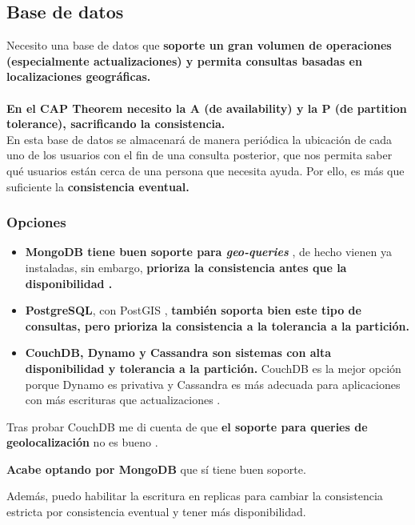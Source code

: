 \subsection{Base de datos}

Necesito una base de datos que \textbf{soporte un gran volumen de operaciones (especialmente actualizaciones) y permita consultas basadas en localizaciones geográficas.} \\ \\
\textbf{En el CAP Theorem \cite{cap} necesito la A (de availability) y la P (de partition tolerance), sacrificando la consistencia.}
\\
En esta base de datos se almacenará de manera periódica la ubicación de cada uno de los usuarios con el fin de una consulta posterior, que nos permita saber qué usuarios
están cerca de una persona que necesita ayuda. Por ello, es más que suficiente la \textbf{consistencia eventual.}

\subsubsection{Opciones}

\begin{itemize}
	\item \textbf{MongoDB tiene buen soporte para \textit{geo-queries}} \cite{mongo}, de hecho vienen ya instaladas, sin embargo, \textbf{prioriza la consistencia antes que la disponibilidad \cite{mongo-cap}.} 
\item \textbf{PostgreSQL}, con PostGIS \cite{postgis}, \textbf{también soporta bien este tipo de consultas, pero prioriza la consistencia a la tolerancia a la partición.} 
\item \textbf{CouchDB, Dynamo y Cassandra son sistemas con alta disponibilidad y tolerancia a la partición.} CouchDB es la mejor opción porque Dynamo es privativa y Cassandra es más adecuada para aplicaciones con más
escrituras que actualizaciones \cite{cassandra}. 
\end{itemize}



Tras probar CouchDB me di cuenta de que \textbf{el soporte para queries de geolocalización} no es bueno \cite{couchdb}.

\textbf{Acabe optando por MongoDB} que sí tiene buen soporte.

Además, puedo habilitar la escritura en replicas para cambiar la consistencia estricta por consistencia eventual y tener más disponibilidad. 


